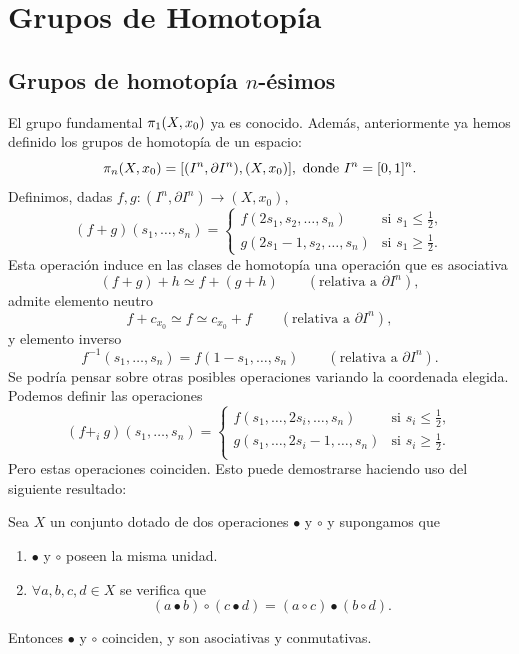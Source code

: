 \chapter{Grupos de Homotopía}
\section{Grupos de homotopía $n$-ésimos}
El grupo fundamental $\pi_{1}(X, x_0)$ ya es conocido. Además, anteriormente ya hemos definido los grupos de homotopía de un espacio:
\[ \pi_{n}(X, x_0) = [(I^n, \partial I^n), (X, x_0)], \text{ donde } I^n = [0,1]^n. \]
Definimos, dadas $f,g : (I^n, \partial I^n) \longrightarrow (X, x_0)$,
\[
(f + g)(s_1, \ldots, s_n) = 
\begin{cases}
f(2s_1, s_2, \ldots, s_n) & \text{si } s_1 \leq \frac{1}{2}, \\
g(2s_1 - 1, s_2, \ldots, s_n) & \text{si } s_1 \geq \frac{1}{2}.
\end{cases}
\]
Esta operación induce en las clases de homotopía una operación que es asociativa
\[
(f + g) + h \simeq f + (g + h) \qquad (\text{relativa a } \partial I^n),
\]
admite elemento neutro
\[
f + c_{x_0} \simeq f \simeq c_{x_0} + f \qquad (\text{relativa a } \partial I^n),
\]
y elemento inverso
\[
f^{-1} (s_1, \ldots, s_n) = f(1 - s_1, \ldots, s_n) \qquad (\text{relativa a } \partial I^n).
\]
Se podría pensar sobre otras posibles operaciones variando la coordenada elegida. Podemos definir las operaciones
\[
(f +_i \: g)(s_1, \ldots, s_n) = 
\begin{cases}
f(s_1, \ldots, 2s_i, \ldots, s_n) & \text{si } s_i \leq \frac{1}{2}, \\
g(s_1, \ldots, 2s_i -1, \ldots, s_n) & \text{si } s_i \geq \frac{1}{2}. \\
\end{cases}
\]
Pero estas operaciones coinciden. Esto puede demostrarse haciendo uso del siguiente resultado:
\begin{prop}
Sea $X$ un conjunto dotado de dos operaciones $\bullet$ y $\circ$ y supongamos que 
\begin{enumerate}
\item $\bullet$ y $\circ$ poseen la misma unidad.
\item $\forall a,b,c,d \in X$ se verifica que
\[
(a \bullet b) \circ (c \bullet d) = (a \circ c) \bullet (b \circ d) .
\]
\end{enumerate}
Entonces $\bullet$ y $\circ$ coinciden, y son asociativas y conmutativas.
\end{prop}
